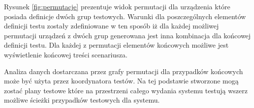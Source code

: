 Rysunek \ref{fig:permutacje}  prezentuje widok permutacji dla urządzenia które posiada definicje dwóch grup testowych. Warunki dla poszczególnych elementów definicji testu zostały zdefiniowane w ten sposób iż dla każdej możliwej permutacji urządzeń z dwóch grup generowana jest inna kombinacja dla końcowej definicji testu. Dla każdej z permutacji elementów końcowych możliwe jest wyświetlenie końcowej treści scenariusza.

Analiza danych dostarczana przez grafy permutacji dla przypadków końcowych może być użyta przez koordynatora testów. Na tej podstawie stworzone mogą zostać plany testowe które na przestrzeni całego wydania systemu testują wszerz możliwe ścieżki przypadków testowych dla systemu.

\begin{figure}[h]
\centering
{}\qquad
{}\\

\end{figure}
